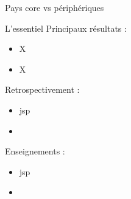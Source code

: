 \documentclass[9pt, xcolor={dvipsnames}]{beamer}
\begin{document}
\begin{frame}[label=results]{Pays core vs périphériques}
\end{frame}

\begin{frame}{L'essentiel}
  Principaux résultats :
  \begin{itemize}
    \item X
    \item X
  \end{itemize}
  \vspace{.2cm}
  Retrospectivement :
  \begin{itemize}
    \item jsp
    \item 
  \end{itemize}
  \vspace{.2cm}
  Enseignements :
  \begin{itemize}
    \item jsp
    \item 
  \end{itemize}
\end{frame}

\end{document}
